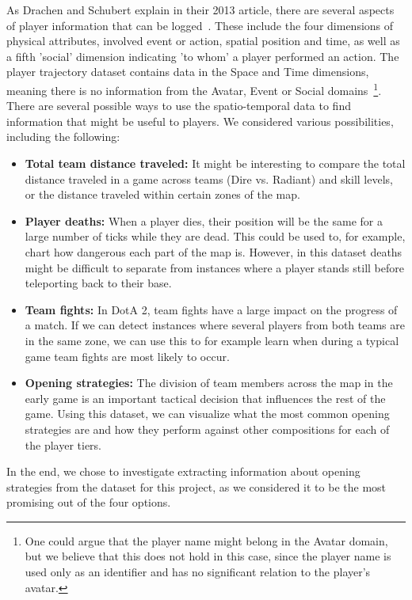 \documentclass[a4paper,11pt]{article}
\begin{document}
As Drachen and Schubert explain in their 2013 article, there are several aspects of player information that can be logged~\cite{drachen2013spatial}. These include the four dimensions of physical attributes, involved event or action, spatial position and time, as well as a fifth 'social' dimension indicating 'to whom' a player performed an action.
The player trajectory dataset contains data in the Space and Time dimensions, meaning there is no information from the Avatar, Event or Social domains~\footnote{One could argue that the player name might belong in the Avatar domain, but we believe that this does not hold in this case, since the player name is used only as an identifier and has no significant relation to the player's avatar.}. There are several possible ways to use the spatio-temporal data to find information that might be useful to players. We considered various possibilities, including the following:

\begin{itemize}
\item \textbf{Total team distance traveled:} It might be interesting to compare the total distance traveled in a game across teams (Dire vs. Radiant) and skill levels, or the distance traveled within certain zones of the map.
\item \textbf{Player deaths:} When a player dies, their position will be the same for a large number of ticks while they are dead. This could be used to, for example, chart how dangerous each part of the map is. However, in this dataset deaths might be difficult to separate from instances where a player stands still before teleporting back to their base.
\item \textbf{Team fights:} In DotA 2, team fights have a large impact on the progress of a match. If we can detect instances where several players from both teams are in the same zone, we can use this to for example learn when during a typical game team fights are most likely to occur.
\item \textbf{Opening strategies:} The division of team members across the map in the early game is an important tactical decision that influences the rest of the game. Using this dataset, we can visualize what the most common opening strategies are and how they perform against other compositions for each of the player tiers.
\end{itemize}
In the end, we chose to investigate extracting information about opening strategies from the dataset for this project, as we considered it to be the most promising out of the four options.
\end{document}
